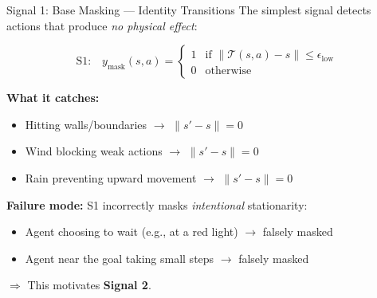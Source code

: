 \documentclass[11pt,aspectratio=169]{beamer}
\begin{document}
\begin{frame}{Signal 1: Base Masking — Identity Transitions}
    The simplest signal detects actions that produce \textit{no physical effect}:

    \begin{equation}
        \text{S1:} \quad y_{\text{mask}}(s, a) =
        \begin{cases}
            1 & \text{if } \|\mathcal{T}(s, a) - s\| \leq \epsilon_{\text{low}} \\
            0 & \text{otherwise}
        \end{cases}
    \end{equation}

    \textbf{What it catches:}
    \begin{itemize}
        \item Hitting walls/boundaries $\rightarrow$ $\|s' - s\| = 0$
        \item Wind blocking weak actions $\rightarrow$ $\|s' - s\| = 0$
        \item Rain preventing upward movement $\rightarrow$ $\|s' - s\| = 0$
    \end{itemize}

    \vspace{0.3cm}
    \textbf{Failure mode:} S1 incorrectly masks \textit{intentional} stationarity:
    \begin{itemize}
        \item Agent choosing to wait (e.g., at a red light) $\rightarrow$ falsely masked
        \item Agent near the goal taking small steps $\rightarrow$ falsely masked
    \end{itemize}

    $\Rightarrow$ This motivates \textbf{Signal 2}.
\end{frame}
\end{document}
